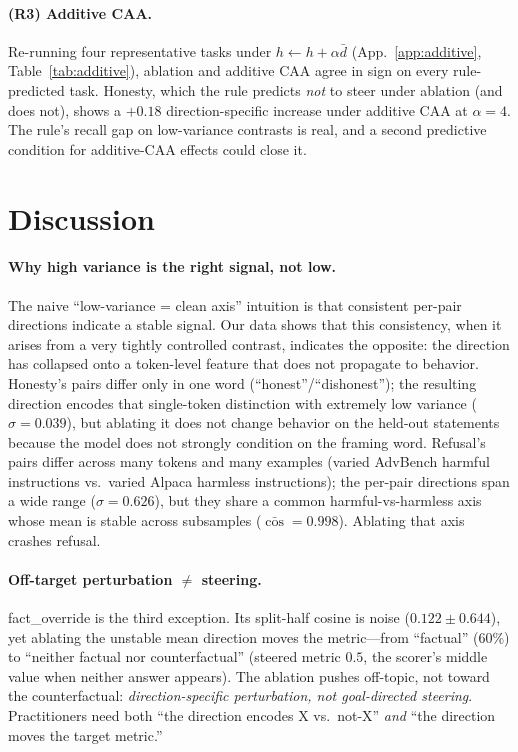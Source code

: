 \documentclass[11pt]{article}
\begin{document}
\paragraph{(R3) Additive CAA.}
Re-running four representative tasks under
$h \leftarrow h + \alpha \bar d$ (App.~\ref{app:additive},
Table~\ref{tab:additive}), ablation and additive CAA agree in sign
on every rule-predicted task. Honesty, which the rule predicts
\emph{not} to steer under ablation (and does not), shows a
$+0.18$ direction-specific increase under additive CAA at $\alpha=4$.
The rule's recall gap on low-variance contrasts is real, and a
second predictive condition for additive-CAA effects could close it.

\section{Discussion}
\label{sec:discussion}

\paragraph{Why high variance is the right signal, not low.}
The naive ``low-variance = clean axis'' intuition is that
consistent per-pair directions indicate a stable signal. Our data
shows that this consistency, when it arises from a very tightly
controlled contrast, indicates the opposite: the direction has
collapsed onto a token-level feature that does not propagate to
behavior. Honesty's pairs differ only in one word
(``honest''/``dishonest''); the resulting direction encodes that
single-token distinction with extremely low variance ($\sigma =
0.039$), but ablating it does not change behavior on the held-out
statements because the model does not strongly condition on the
framing word. Refusal's pairs differ across many tokens and many
examples (varied AdvBench harmful instructions vs.~varied Alpaca
harmless instructions); the per-pair directions span a wide range
($\sigma = 0.626$), but they share a common harmful-vs-harmless
axis whose mean is stable across subsamples ($\bar{\cos} = 0.998$).
Ablating that axis crashes refusal.

\paragraph{Off-target perturbation $\neq$ steering.}
fact\_override is the third exception. Its split-half cosine is
noise ($0.122 \pm 0.644$), yet ablating the unstable mean direction
moves the metric---from ``factual'' (60\%) to ``neither factual nor
counterfactual'' (steered metric $0.5$, the scorer's middle value
when neither answer appears). The ablation pushes off-topic, not
toward the counterfactual: \emph{direction-specific perturbation,
not goal-directed steering}. Practitioners need both ``the
direction encodes X vs.~not-X'' \emph{and} ``the direction moves
the target metric.''
\end{document}
